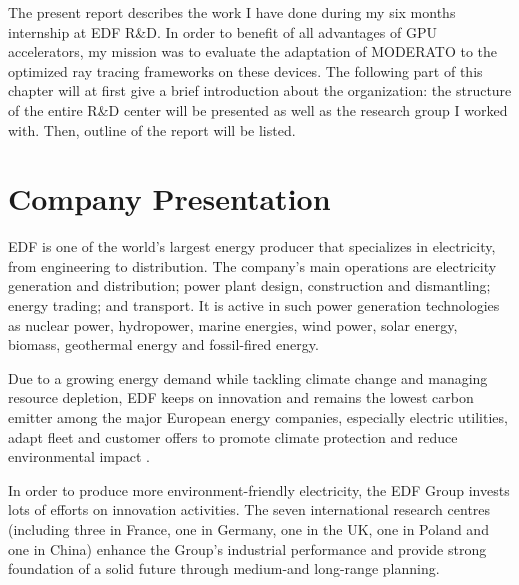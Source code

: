 The present report describes the work I have done during my six months internship at EDF R\&D. In order to benefit of all advantages of GPU accelerators, my mission was to evaluate the adaptation of MODERATO to the optimized ray tracing frameworks on these devices. The following part of this chapter will at first give a brief introduction about the organization: the structure of the entire R\&D center will be presented as well as the research group I worked with. Then, outline of the report will be listed.

\section{Company Presentation}
EDF \citep{edf} is one of the world's largest energy producer that specializes in electricity, from engineering to distribution. The company's main operations are electricity generation and distribution; power plant design, construction and dismantling; energy trading; and transport. It is active in such power generation technologies as nuclear power, hydropower, marine energies, wind power, solar energy, biomass, geothermal energy and fossil-fired energy.

Due to a growing energy demand while tackling climate change and managing resource depletion, EDF keeps on innovation and remains the lowest carbon emitter among the major European energy companies, especially electric utilities, adapt fleet and customer offers to promote climate protection and reduce environmental impact \citep{edfgroup}.

In order to produce more environment-friendly electricity, the EDF Group invests lots of efforts on innovation activities. The seven international research centres (including three in France, one in Germany, one in the UK, one in Poland and one in China) enhance the Group's industrial performance and provide strong foundation of a solid future through medium-and long-range planning.

